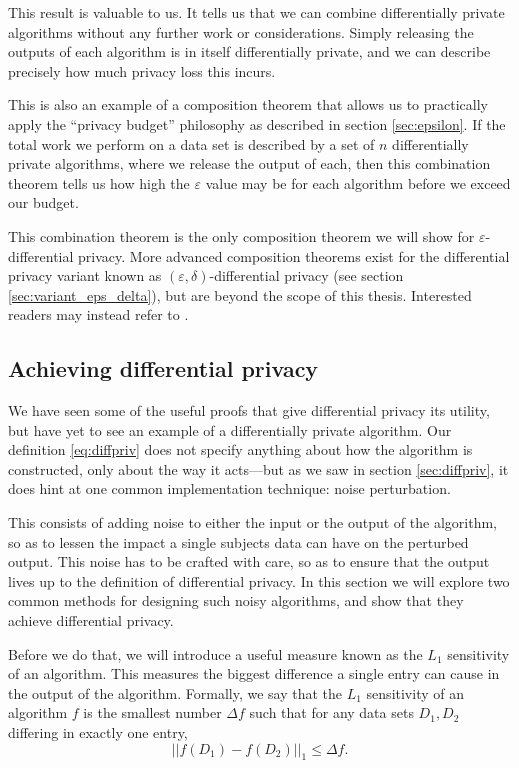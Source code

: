 \documentclass[a4paper,12pt]{article}
\renewcommand{\epsilon}{\varepsilon}
\begin{document}
This result is valuable to us. It tells us that we can combine differentially private algorithms without any further work or considerations. Simply releasing the outputs of each algorithm is in itself differentially private, and we can describe precisely how much privacy loss this incurs.

This is also an example of a composition theorem that allows us to practically apply the ``privacy budget'' philosophy as described in section \ref{sec:epsilon}. If the total work we perform on a data set is described by a set of $n$ differentially private algorithms, where we release the output of each, then this combination theorem tells us how high the $\epsilon$ value may be for each algorithm before we exceed our budget.

This combination theorem is the only composition theorem we will show for $\epsilon$-differential privacy. More advanced composition theorems exist for the differential privacy variant known as $(\epsilon,\delta)$-differential privacy (see section \ref{sec:variant_eps_delta}), but are beyond the scope of this thesis. Interested readers may instead refer to \cite[ch.~3]{dwork_privacybook}.

\subsection{Achieving differential privacy \label{sec:achieving}}

We have seen some of the useful proofs that give differential privacy its utility, but have yet to see an example of a differentially private algorithm. Our definition \ref{eq:diffpriv} does not specify anything about how the algorithm is constructed, only about the way it acts---but as we saw in section \ref{sec:diffpriv}, it does hint at one common implementation technique: noise perturbation.

This consists of adding noise to either the input or the output of the algorithm, so as to lessen the impact a single subjects data can have on the perturbed output. This noise has to be crafted with care, so as to ensure that the output lives up to the definition of differential privacy. In this section we will explore two common methods for designing such noisy algorithms, and show that they achieve differential privacy. 

Before we do that, we will introduce a useful measure known as the $L_1$ sensitivity of an algorithm. This measures the biggest difference a single entry can cause in the output of the algorithm. Formally, we say that the $L_1$ sensitivity of an algorithm $f$ is the smallest number $\Delta f$ such that for any data sets $D_1,D_2$ differing in exactly one entry,
\begin{equation}\label{eq:L1_sensitivity}
    ||f(D_1)-f(D_2)||_1 \leq \Delta f.
\end{equation}
\end{document}
